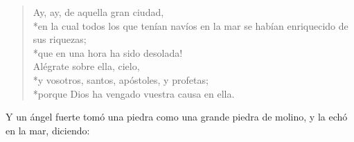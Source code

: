 \begin{verse}
Ay, ay, de aquella gran ciudad,\\*\vin en la cual todos los que tenían navíos en la mar se habían enriquecido de sus riquezas;\\*\vin que en una hora ha sido desolada!%
	\\
Alégrate sobre ella, cielo,\\*\vin y vosotros, santos, apóstoles, y profetas;\\*\vin porque Dios ha vengado vuestra causa en ella.%
\end{verse}
Y un ángel fuerte tomó una piedra como una grande piedra de molino, y la echó en la mar, diciendo:
